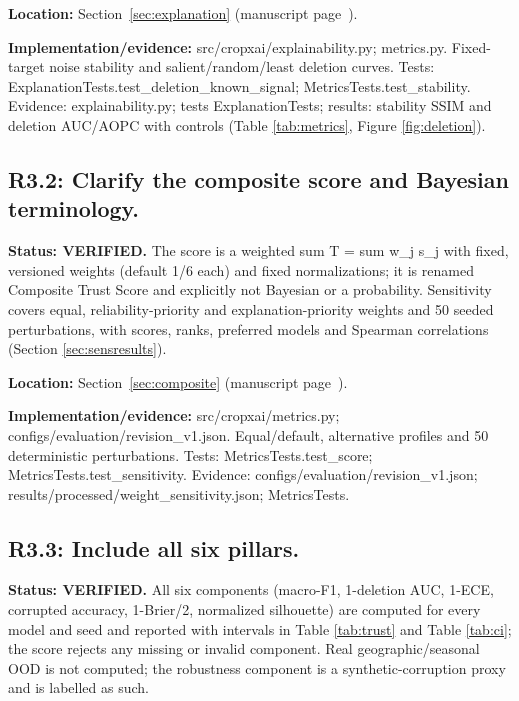 \documentclass[3p,times,procedia]{elsarticle}
\begin{document}
\par\textbf{Location:} Section~\ref{sec:explanation} (manuscript page~\pageref{sec:explanation}).

\par\textbf{Implementation/evidence:} src/cropxai/explainability.py; metrics.py. Fixed-target noise stability and salient/random/least deletion curves. Tests: ExplanationTests.test\_deletion\_known\_signal; MetricsTests.test\_stability. Evidence: explainability.py; tests ExplanationTests; results: stability SSIM and deletion AUC/AOPC with controls (Table \ref{tab:metrics}, Figure \ref{fig:deletion}).

\subsection*{R3.2: Clarify the composite score and Bayesian terminology.}

\textbf{Status: VERIFIED.} The score is a weighted sum T = sum w\_j s\_j with fixed, versioned weights (default 1/6 each) and fixed normalizations; it is renamed Composite Trust Score and explicitly not Bayesian or a probability. Sensitivity covers equal, reliability-priority and explanation-priority weights and 50 seeded perturbations, with scores, ranks, preferred models and Spearman correlations (Section \ref{sec:sensresults}).

\par\textbf{Location:} Section~\ref{sec:composite} (manuscript page~\pageref{sec:composite}).

\par\textbf{Implementation/evidence:} src/cropxai/metrics.py; configs/evaluation/revision\_v1.json. Equal/default, alternative profiles and 50 deterministic perturbations. Tests: MetricsTests.test\_score; MetricsTests.test\_sensitivity. Evidence: configs/evaluation/revision\_v1.json; results/processed/weight\_sensitivity.json; MetricsTests.

\subsection*{R3.3: Include all six pillars.}

\textbf{Status: VERIFIED.} All six components (macro-F1, 1-deletion AUC, 1-ECE, corrupted accuracy, 1-Brier/2, normalized silhouette) are computed for every model and seed and reported with intervals in Table \ref{tab:trust} and Table \ref{tab:ci}; the score rejects any missing or invalid component. Real geographic/seasonal OOD is not computed; the robustness component is a synthetic-corruption proxy and is labelled as such.
\end{document}
